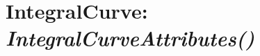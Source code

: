 \documentclass[letterpaper,10pt,english]{sphinxmanual}
\begin{document}
\begin{DUlineblock}{0em}
\item[] 
\end{DUlineblock}

\begin{DUlineblock}{0em}
\item[] 
\end{DUlineblock}


\section{\textbf{IntegralCurve}: \emph{IntegralCurveAttributes()}}
\label{attributes:integralcurve-integralcurveattributes}
\begin{DUlineblock}{0em}
\item[] 
\end{DUlineblock}
\end{document}
